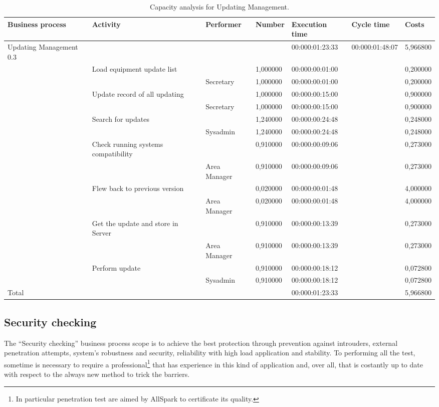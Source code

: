 \begin{landscape}
\begin{table}
\centering
{\tiny
\begin{tabular}{|l|l|l|l|l|l|l|}
Business process&Activity&Performer&Number&Execution time&Cycle time&Costs\\
\hline
Updating Management 0.3&&&&00:000:01:23:33&00:000:01:48:07&5,966800\\
\hline
&Load equipment update list &&1,000000&00:000:00:01:00&&0,200000\\
\hline
&&Secretary &1,000000&00:000:00:01:00&&0,200000\\
\hline
&Update record of all updating &&1,000000&00:000:00:15:00&&0,900000\\
\hline
&&Secretary &1,000000&00:000:00:15:00&&0,900000\\
\hline
&Search for updates &&1,240000&00:000:00:24:48&&0,248000\\
\hline
&&Sysadmin &1,240000&00:000:00:24:48&&0,248000\\
\hline
&Check running systems compatibility &&0,910000&00:000:00:09:06&&0,273000\\
\hline
&&Area Manager &0,910000&00:000:00:09:06&&0,273000\\
\hline
&Flew back to previous version &&0,020000&00:000:00:01:48&&4,000000\\
\hline
&&Area Manager &0,020000&00:000:00:01:48&&4,000000\\
\hline
&Get the update and store in Server &&0,910000&00:000:00:13:39&&0,273000\\
\hline
&&Area Manager &0,910000&00:000:00:13:39&&0,273000\\
\hline
&Perform update &&0,910000&00:000:00:18:12&&0,072800\\
\hline
&&Sysadmin &0,910000&00:000:00:18:12&&0,072800\\
\hline
Total&&&&00:000:01:23:33&&5,966800
\end{tabular}
}
\caption{Capacity analysis for Updating Management.}
\end{table}
\end{landscape}
%

%

\subsection{Security checking}
The ``Security checking'' business process scope is to achieve the best protection through prevention against introuders, external penetration attempts, system's robustness and security, reliability with high load application and stability. To performing all the test, sometime is necessary to require a professional\footnote{In particular penetration test are aimed by AllSpark to certificate its quality.} that has experience in this kind of application and, over all, that is costantly up to date with respect to the always new method to trick the barriers.


